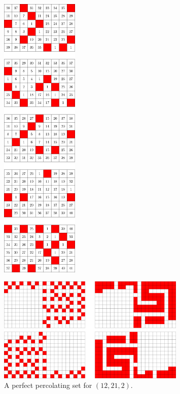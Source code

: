 \begin{figure}[H]
\centering
\includegraphics[width=0.33\textwidth]{figures/A/6x9x5_numbered_heatmap.pdf}
\caption{}
\label{fig:6x9x5_numbered_heatmap}
\end{figure}

\newpage


\begin{figure}[H]
\centering
\includegraphics[width=0.8\textwidth]{figures/7/12x21x2.pdf}
\caption{A perfect percolating set for $(12,21,2)$.}
\label{fig:12x21x2}
\end{figure} 

